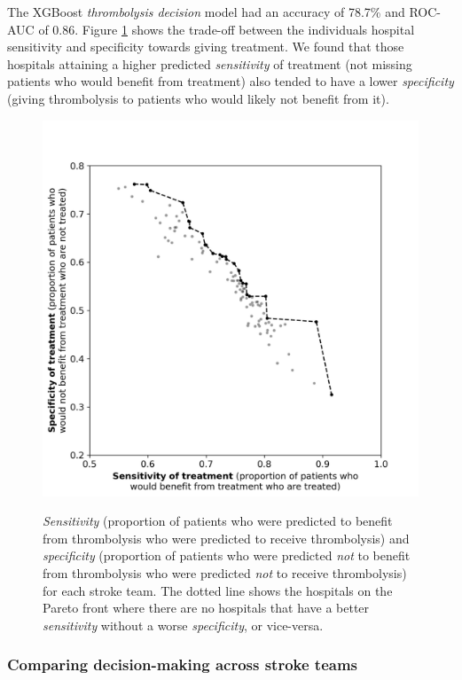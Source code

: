 The XGBoost \textit{thrombolysis decision} model had an accuracy of 78.7\% and ROC-AUC of 0.86. Figure \ref{fig:hosp_shap_scatter} shows the trade-off between the individuals hospital sensitivity and specificity towards giving treatment. We found that those hospitals attaining a higher predicted \textit{sensitivity} of treatment (not missing patients who would benefit from treatment) also tended to have a lower \textit{specificity} (giving thrombolysis to patients who would likely not benefit from it).

\begin{figure}
    \centering
    {\includegraphics[width=0.65\linewidth]{./images/p4_spec_sens}} 
    \caption{\textit{Sensitivity} (proportion of patients who were predicted to benefit from thrombolysis who were predicted to receive thrombolysis) and \textit{specificity} (proportion of patients who were predicted \textit{not} to benefit from thrombolysis who were predicted \textit{not} to receive thrombolysis) for each stroke team. The dotted line shows the hospitals on the Pareto front where there are no hospitals that have a better \textit{sensitivity} without a worse \textit{specificity}, or vice-versa.}
    \label{fig:hosp_shap_scatter}
\end{figure}

\subsubsection{Comparing decision-making across stroke teams}

